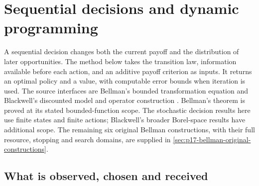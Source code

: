 \chapter{Sequential decisions and dynamic programming}
\label{sec:p17-sequential-decisions}

A sequential decision changes both the current payoff and the
distribution of later opportunities. The method below takes the
transition law, information available before each action, and an
additive payoff criterion as inputs. It returns an optimal policy
and a value, with computable error bounds when iteration is used.
The source interfaces are Bellman's bounded transformation equation
\cite[Theorem~1, pp.~716--718]{Bellman1952DynamicProgramming}
and Blackwell's discounted model and operator construction
\cite[Sections~2--3 and Theorems~3--8, pp.~227--234]{Blackwell1965Discounted}.
Bellman's theorem is proved at its stated bounded-function scope.
The stochastic decision results here use finite states and finite
actions; Blackwell's broader Borel-space results have additional scope.
The remaining six original Bellman constructions, with their full
resource, stopping and search domains, are supplied in
\cref{sec:p17-bellman-original-constructions}.

\section{What is observed, chosen and received}

